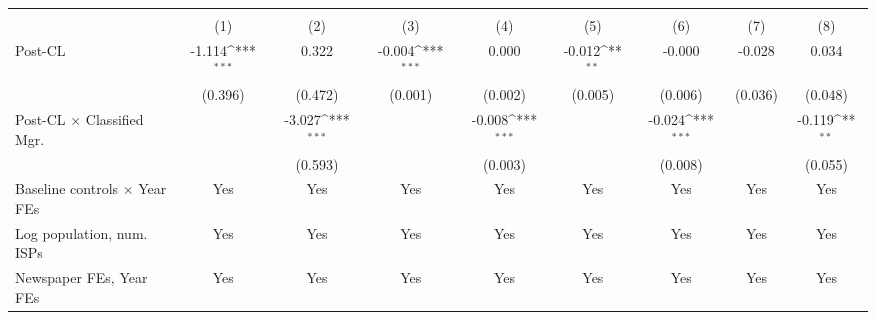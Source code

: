 {
\def\sym#1{\ifmmode^{#1}\else\(^{#1}\)\fi}
\begin{tabular}{l*{8}{c}}
\toprule
                    &&&&\\\cmidrule(lr){2-3}\cmidrule(lr){4-5}\cmidrule(lr){6-7}\cmidrule(lr){8-9}
                    &         &         &         &         &         &         &         &         \\
\midrule
Post-CL             &      -1.114\sym{***}&       0.322         &      -0.004\sym{***}&       0.000         &      -0.012\sym{**} &      -0.000         &      -0.028         &       0.034         \\
                    &     (0.396)         &     (0.472)         &     (0.001)         &     (0.002)         &     (0.005)         &     (0.006)         &     (0.036)         &     (0.048)         \\
\addlinespace
Post-CL $\times$ Classified Mgr.&                     &      -3.027\sym{***}&                     &      -0.008\sym{***}&                     &      -0.024\sym{***}&                     &      -0.119\sym{**} \\
                    &                     &     (0.593)         &                     &     (0.003)         &                     &     (0.008)         &                     &     (0.055)         \\
\addlinespace
Baseline controls $\times$ Year FEs &         Yes         &         Yes         &         Yes         &         Yes         &         Yes         &         Yes         &         Yes         &         Yes         \\
\addlinespace
Log population, num. ISPs &         Yes         &         Yes         &         Yes         &         Yes         &         Yes         &         Yes         &         Yes         &         Yes         \\
\addlinespace
Newspaper FEs, Year FEs &         Yes         &         Yes         &         Yes         &         Yes         &         Yes         &         Yes         &         Yes         &         Yes         \\

\end{tabular}}
